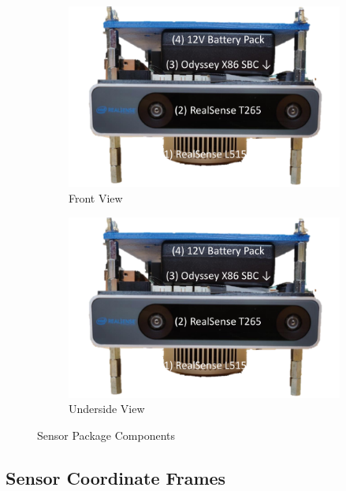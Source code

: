 \begin{figure}[!htb]
  \centering
  \begin{subfigure}[t]{.40\linewidth}
    \centering\includegraphics[page=1,clip,trim=0cm 0cm 0cm 0cm,width=.99\linewidth]{chapter_7_experiments/imgs/sensor_package.pdf}
    \caption{\label{fig:ch7_sensor_package_a}Front View}
  \end{subfigure}
  \begin{subfigure}[t]{.40\linewidth}
    \centering\includegraphics[page=3,clip,trim=0cm 0cm 0cm 0cm,width=.99\linewidth]{chapter_7_experiments/imgs/sensor_package.pdf}
    \caption{\label{fig:ch7_sensor_package_b}Underside View}
  \end{subfigure}
  \caption[Sensor package components]{Sensor Package Components}\label{fig:ch7_sensor_package_pic}
\end{figure}

\subsection{Sensor Coordinate Frames}

